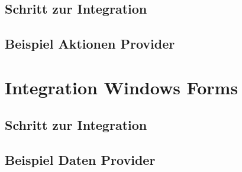 \subsection{Schritt zur Integration}

\subsection{Beispiel Aktionen Provider}

\section{Integration Windows Forms}
\label{sec:integration_winforms_impl}

\subsection{Schritt zur Integration}

\subsection{Beispiel Daten Provider}


